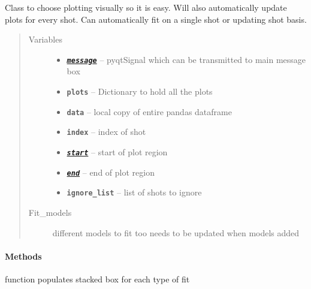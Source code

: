 \documentclass[letterpaper,10pt,english]{sphinxmanual}
\begin{document}
\begin{fulllineitems}
\label{VisualPlotter:Visualplotterwidget.VisualPlotter}
Class to choose plotting visually so it is easy.  Will also 
automatically update plots for every shot.  Can automatically fit on a 
single shot or updating shot basis.
\begin{quote}\begin{description}
\item[{Variables}] \leavevmode\begin{itemize}
\item {} 
{\hyperref[Options:Optionswidgets.Options.message]{\emph{\textbf{\texttt{message}}}}} -- pyqtSignal which can be transmitted to main message box

\item {} 
\textbf{\texttt{plots}} -- Dictionary to hold all the plots

\item {} 
\textbf{\texttt{data}} -- local copy of entire pandas dataframe

\item {} 
\textbf{\texttt{index}} -- index of shot

\item {} 
{\hyperref[MainWindow:SpinorMonitor.MainWindow.start]{\emph{\textbf{\texttt{start}}}}} -- start of plot region

\item {} 
{\hyperref[MainWindow:SpinorMonitor.MainWindow.end]{\emph{\textbf{\texttt{end}}}}} -- end of plot region

\item {} 
\textbf{\texttt{ignore\_list}} -- list of shots to ignore

\end{itemize}

\item[{Fit\_models}] \leavevmode
different models to fit too needs to be updated when models added

\end{description}\end{quote}
\paragraph{Methods}

\begin{fulllineitems}
\label{VisualPlotter:Visualplotterwidget.VisualPlotter.add_fitting_widgets}
function populates stacked box for each type of fit


\end{fulllineitems}
\end{fulllineitems}
\end{document}
